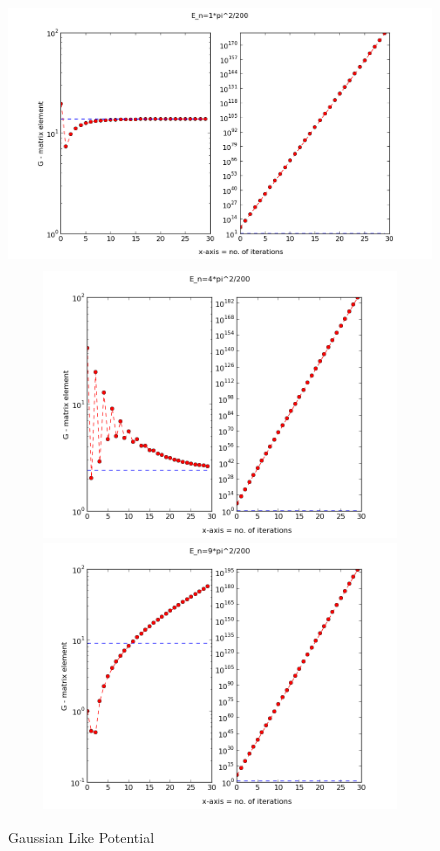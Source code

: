 \documentclass[a4paper,10pt]{report}
\begin{document}
\begin{center}
\begin{figure}[lht]
\includegraphics[width=360pt, height=200pt]{series3a.png}
\includegraphics[width=360pt, height=200pt]{series3b.png}
\includegraphics[width=360pt, height=200pt]{series3c.png}
\caption[\textwidth]{Gaussian Like Potential}
\end{figure}
\end{center}
% 
% 
\end{document}
